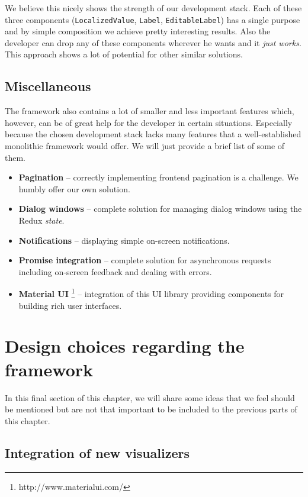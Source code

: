 We believe this nicely shows the strength of our development stack. Each of these three components (\texttt{LocalizedValue}, \texttt{Label}, \texttt{EditableLabel}) has a single purpose and by simple composition we achieve pretty interesting results. Also the developer can drop any of these components wherever he wants and it \emph{just works}. This approach shows a lot of potential for other similar solutions.

\subsection{Miscellaneous}

The framework also contains a lot of smaller and less important features which, however, can be of great help for the developer in certain situations. Especially because  the chosen development stack lacks many features that a well-established monolithic framework would offer.  We will just provide a brief list of some of them. 

\begin{itemize}
\item \textbf{Pagination} -- correctly implementing frontend pagination is a challenge. We humbly offer our own solution.
\item \textbf{Dialog windows} -- complete solution for managing dialog windows using the Redux \emph{state}.
\item \textbf{Notifications} -- displaying simple on-screen notifications.
\item \textbf{Promise integration} -- complete solution for asynchronous requests including on-screen feedback and dealing with errors.
\item \textbf{Material UI} \footnote{http://www.material\-ui.com/} -- integration of this UI library providing components for building rich user interfaces.

\end{itemize}
\section{Design choices regarding the framework}

In this final section of this chapter, we will share some ideas that we feel should be mentioned but are not that important to be included to the previous parts of this chapter.

\subsection{Integration of new visualizers}
\label{sec:implementation:design-choices:integration}

